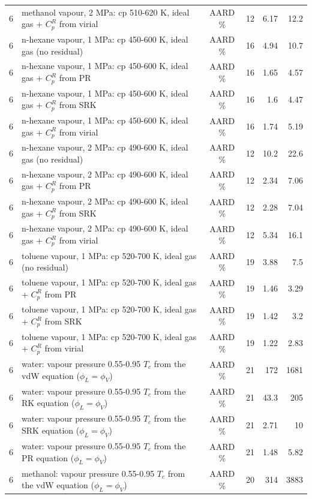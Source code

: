 \begin{tabular}{c p{8.6cm} c r r r}
6 & methanol vapour, 2 MPa: cp 510-620 K, ideal gas + $C_p^R$ from virial & AARD \% & 12 & 6.17 & 12.2 \\
6 & n-hexane vapour, 1 MPa: cp 450-600 K, ideal gas (no residual) & AARD \% & 16 & 4.94 & 10.7 \\
6 & n-hexane vapour, 1 MPa: cp 450-600 K, ideal gas + $C_p^R$ from PR & AARD \% & 16 & 1.65 & 4.57 \\
6 & n-hexane vapour, 1 MPa: cp 450-600 K, ideal gas + $C_p^R$ from SRK & AARD \% & 16 & 1.6 & 4.47 \\
6 & n-hexane vapour, 1 MPa: cp 450-600 K, ideal gas + $C_p^R$ from virial & AARD \% & 16 & 1.74 & 5.19 \\
6 & n-hexane vapour, 2 MPa: cp 490-600 K, ideal gas (no residual) & AARD \% & 12 & 10.2 & 22.6 \\
6 & n-hexane vapour, 2 MPa: cp 490-600 K, ideal gas + $C_p^R$ from PR & AARD \% & 12 & 2.34 & 7.06 \\
6 & n-hexane vapour, 2 MPa: cp 490-600 K, ideal gas + $C_p^R$ from SRK & AARD \% & 12 & 2.28 & 7.04 \\
6 & n-hexane vapour, 2 MPa: cp 490-600 K, ideal gas + $C_p^R$ from virial & AARD \% & 12 & 5.34 & 16.1 \\
6 & toluene vapour, 1 MPa: cp 520-700 K, ideal gas (no residual) & AARD \% & 19 & 3.88 & 7.5 \\
6 & toluene vapour, 1 MPa: cp 520-700 K, ideal gas + $C_p^R$ from PR & AARD \% & 19 & 1.46 & 3.29 \\
6 & toluene vapour, 1 MPa: cp 520-700 K, ideal gas + $C_p^R$ from SRK & AARD \% & 19 & 1.42 & 3.2 \\
6 & toluene vapour, 1 MPa: cp 520-700 K, ideal gas + $C_p^R$ from virial & AARD \% & 19 & 1.22 & 2.83 \\
6 & water: vapour pressure 0.55-0.95 $T_c$ from the vdW equation ($\phi_L = \phi_V$) & AARD \% & 21 & 172 & 1681 \\
6 & water: vapour pressure 0.55-0.95 $T_c$ from the RK equation ($\phi_L = \phi_V$) & AARD \% & 21 & 43.3 & 205 \\
6 & water: vapour pressure 0.55-0.95 $T_c$ from the SRK equation ($\phi_L = \phi_V$) & AARD \% & 21 & 2.71 & 10 \\
6 & water: vapour pressure 0.55-0.95 $T_c$ from the PR equation ($\phi_L = \phi_V$) & AARD \% & 21 & 1.48 & 5.82 \\
6 & methanol: vapour pressure 0.55-0.95 $T_c$ from the vdW equation ($\phi_L = \phi_V$) & AARD \% & 20 & 314 & 3883 \\

\end{tabular}
